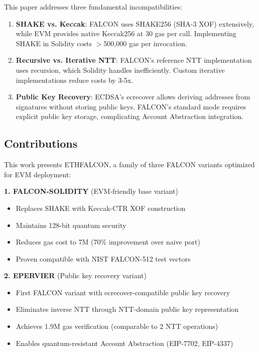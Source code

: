 This paper addresses three fundamental incompatibilities:
\begin{enumerate}
    \item \textbf{SHAKE vs. Keccak}: FALCON uses SHAKE256 (SHA-3 XOF) extensively, while EVM provides native Keccak256 at 30 gas per call. Implementing SHAKE in Solidity costs $>$500,000 gas per invocation.
    \item \textbf{Recursive vs. Iterative NTT}: FALCON's reference NTT implementation uses recursion, which Solidity handles inefficiently. Custom iterative implementations reduce costs by 3-5x.
    \item \textbf{Public Key Recovery}: ECDSA's ecrecover allows deriving addresses from signatures without storing public keys. FALCON's standard mode requires explicit public key storage, complicating Account Abstraction integration.
\end{enumerate}

\subsection{Contributions}

This work presents ETHFALCON, a family of three FALCON variants optimized for EVM deployment:

\textbf{1. FALCON-SOLIDITY} (EVM-friendly base variant)
\begin{itemize}
    \item Replaces SHAKE with Keccak-CTR XOF construction
    \item Maintains 128-bit quantum security
    \item Reduces gas cost to 7M (70\% improvement over naive port)
    \item Proven compatible with NIST FALCON-512 test vectors
\end{itemize}

\textbf{2. EPERVIER} (Public key recovery variant)
\begin{itemize}
    \item First FALCON variant with ecrecover-compatible public key recovery
    \item Eliminates inverse NTT through NTT-domain public key representation
    \item Achieves 1.9M gas verification (comparable to 2 NTT operations)
    \item Enables quantum-resistant Account Abstraction (EIP-7702, EIP-4337)
\end{itemize}

